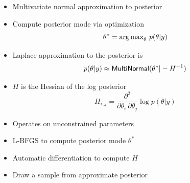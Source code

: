 \documentclass[10pt]{report}
\begin{document}
\begin{itemize}
\item Multivariate normal approximation to posterior
\item Compute posterior mode via optimization
\[
\theta^{*} = \mbox{arg\,max}_{\theta} \  p(\theta | y) 
\]
\item Laplace approximation to the posterior is
\[
p(\theta | y) 
\approx 
\text{\sf MultiNormal}(\theta^{*} | -H^{-1})
\]
\item $H$ is the Hessian of the log posterior
\[
H_{i,j} 
= \frac{\partial^2}{\partial \theta_i \ \partial \theta_j}
  \log p(\theta | y)
\]
\end{itemize}


\begin{itemize}
\item Operates on unconstrained parameters
\item L-BFGS to compute posterior mode $\theta^*$
\item Automatic differentiation to compute $H$
\item Draw a sample from approximate posterior
\end{itemize}


\end{document}
